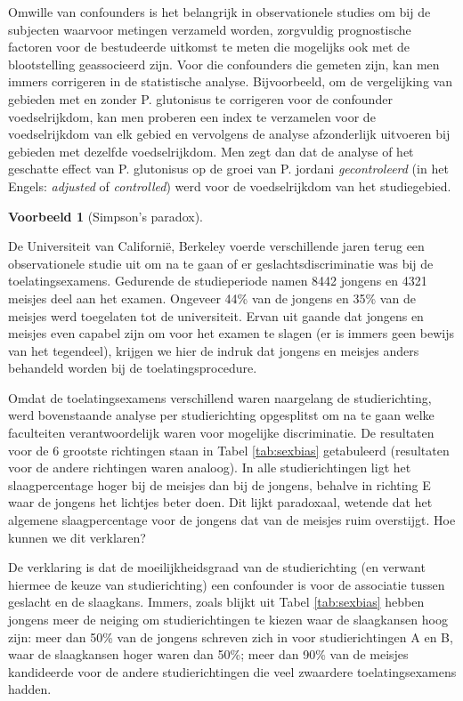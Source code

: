 \documentclass[
  12pt,dutch,coursenotes]{book}
\theoremstyle{definition}
\theoremstyle{definition}
\newtheorem{example}{Voorbeeld}[chapter]
\theoremstyle{definition}
\theoremstyle{definition}
\theoremstyle{remark}
\begin{document}
Omwille van confounders is het belangrijk in observationele studies om bij
de subjecten waarvoor metingen verzameld worden, zorgvuldig prognostische factoren voor de bestudeerde uitkomst te meten die mogelijks ook met de blootstelling geassocieerd zijn.
Voor die confounders die gemeten zijn, kan men immers corrigeren in de
statistische analyse. Bijvoorbeeld, om de vergelijking van gebieden met en
zonder P. glutonisus te corrigeren voor de confounder voedselrijkdom, kan men proberen een index te verzamelen voor de voedselrijkdom van elk gebied en vervolgens de analyse
afzonderlijk uitvoeren bij gebieden met dezelfde voedselrijkdom.
Men zegt dan dat de analyse of het geschatte
effect van P. glutonisus op de groei van P. jordani \emph{gecontroleerd} (in het Engels:
\emph{adjusted} of \emph{controlled}) werd voor de voedselrijkdom van het studiegebied.

\begin{example}[Simpson's paradox]
\protect\hypertarget{exm:unnamed-chunk-82}{}{\label{exm:unnamed-chunk-82} {} }
\end{example}

De Universiteit van
Californië, Berkeley voerde verschillende jaren terug een observationele
studie uit om na te gaan of er geslachtsdiscriminatie was bij de
toelatingsexamens. Gedurende de studieperiode namen 8442 jongens en 4321
meisjes deel aan het examen. Ongeveer 44\% van de jongens en 35\% van de
meisjes werd toegelaten tot de universiteit. Ervan uit gaande dat jongens en
meisjes even capabel zijn om voor het examen te slagen (er is immers geen
bewijs van het tegendeel), krijgen we hier de indruk dat jongens en meisjes
anders behandeld worden bij de toelatingsprocedure.

Omdat de toelatingsexamens verschillend waren naargelang de studierichting,
werd bovenstaande analyse per studierichting opgesplitst om na te gaan welke
faculteiten verantwoordelijk waren voor mogelijke discriminatie. De
resultaten voor de 6 grootste richtingen staan in Tabel \ref{tab:sexbias}
getabuleerd (resultaten voor de andere richtingen waren analoog). In alle
studierichtingen ligt het slaagpercentage hoger bij de meisjes dan bij de
jongens, behalve in richting E waar de jongens het lichtjes beter doen. Dit
lijkt paradoxaal, wetende dat het algemene slaagpercentage voor de jongens
dat van de meisjes ruim overstijgt. Hoe kunnen we dit verklaren?

De verklaring is dat de moeilijkheidsgraad van de studierichting (en verwant
hiermee de keuze van studierichting) een confounder is voor de associatie
tussen geslacht en de slaagkans. Immers, zoals blijkt uit Tabel \ref{tab:sexbias} hebben jongens meer de neiging om studierichtingen te kiezen
waar de slaagkansen hoog zijn: meer dan 50\% van de jongens schreven zich in
voor studierichtingen A en B, waar de slaagkansen hoger waren dan 50\%; meer
dan 90\% van de meisjes kandideerde voor de andere studierichtingen die veel
zwaardere toelatingsexamens hadden.
\end{document}
